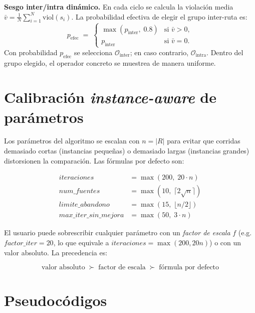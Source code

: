 \documentclass[12pt, a4paper]{article}
\begin{document}
\medskip
\noindent
\textbf{Sesgo inter/intra dinámico.} En cada ciclo se calcula la violación media
$\bar{v} = \tfrac{1}{N}\sum_{i=1}^{N}\mathrm{viol}(s_i)$. La probabilidad
efectiva de elegir el grupo inter-ruta es:
\[
p_{\mathrm{efec}} \;=\;
\begin{cases}
  \max(p_{\mathrm{inter}},\; 0.8) & \text{si } \bar{v} > 0, \\
  p_{\mathrm{inter}}              & \text{si } \bar{v} = 0.
\end{cases}
\]
Con probabilidad $p_{\mathrm{efec}}$ se selecciona $\mathcal{O}_{\mathrm{inter}}$;
en caso contrario, $\mathcal{O}_{\mathrm{intra}}$. Dentro del grupo elegido, el
operador concreto se muestrea de manera uniforme.

\section{Calibración \emph{instance-aware} de parámetros}

Los parámetros del algoritmo se escalan con $n = |R|$ para evitar que
corridas demasiado cortas (instancias pequeñas) o demasiado largas (instancias
grandes) distorsionen la comparación. Las fórmulas por defecto son:

\begin{align*}
\mathit{iteraciones}        &= \max(200,\; 20 \cdot n) \\
\mathit{num\_fuentes}       &= \max(10,\; \lceil 2\sqrt{n} \rceil) \\
\mathit{limite\_abandono}   &= \max(15,\; \lfloor n/2 \rfloor) \\
\mathit{max\_iter\_sin\_mejora} &= \max(50,\; 3 \cdot n)
\end{align*}

El usuario puede sobrescribir cualquier parámetro con un \emph{factor de escala}
$f$ (e.g.\ $\mathit{factor\_iter} = 20$, lo que equivale a
$\mathit{iteraciones} = \max(200, 20n)$) o con un valor absoluto. La precedencia es:

\[
\text{valor absoluto} \;\succ\; \text{factor de escala} \;\succ\; \text{fórmula por defecto}
\]

\section{Pseudocódigos}
\end{document}
